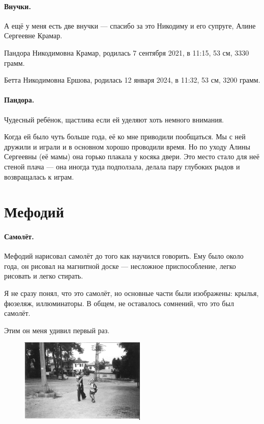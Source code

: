 \documentclass{book}
\begin{document}
\paragraph{Внучки.}
А ещё у меня есть две внучки --- спасибо за это Никодиму и его супруге, Алине Сергеевне Крамар.

Пандора Никодимовна Крамар, родилась 7 сентября 2021, в 11:15, 53 см, 3330 грамм.

Бетта Никодимовна Ершова, родилась 12 января 2024, в 11:32, 53 см, 3200 грамм.

\paragraph{Пандора.}
Чудесный ребёнок, щастлива если ей уделяют хоть немного внимания.

Когда ей было чуть больше года, её ко мне приводили пообщаться.
Мы с ней дружили и играли и в основном хорошо проводили время.
Но по уходу Алины Сергеевны (её мамы) она горько плакала у косяка двери.
Это место стало для неё стеной плача --- она иногда туда подползала, делала пару глубоких рыдов и возвращалась к играм.


\section*{Мефодий}

\paragraph{Самолёт.} Мефодий нарисовал самолёт до того как научился говорить.
Ему было около года, он рисовал на магнитной доске --- несложное приспособление, легко рисовать и легко стирать.

Я не сразу понял, что это самолёт, но основные части были изображены: крылья, фюзеляж, иллюминаторы.
В общем, не оставалось сомнений, что это был самолёт.

Этим он меня удивил первый раз.

\begin{figure}
\vskip-7mm
\centering
\includegraphics[width=60mm,angle=0]{photo/tosha-nikodim-mefody-bw}
\end{figure}
\end{document}
